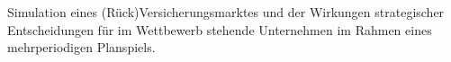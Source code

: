 \begin{course}
\begin{learningoutcomes}
\end{learningoutcomes}

\begin{content}
Simulation eines (Rück)Versicherungsmarktes und der Wirkungen strategischer Entscheidungen für im Wettbewerb stehende Unternehmen im Rahmen eines mehrperiodigen Planspiels.


\end{content}







\end{course}